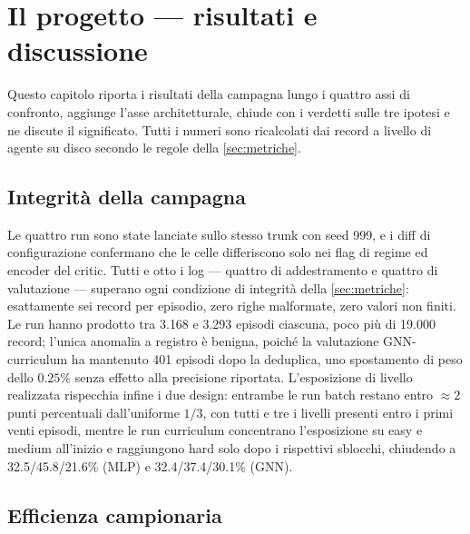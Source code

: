 \chapter{Il progetto --- risultati e discussione}
\label{ch:risultati}

Questo capitolo riporta i risultati della campagna lungo i quattro assi
di confronto, aggiunge l'asse architetturale, chiude con i verdetti
sulle tre ipotesi e ne discute il significato. Tutti i numeri sono
ricalcolati dai record a livello di agente su disco secondo le regole
della \cref{sec:metriche}.

\section{Integrità della campagna}
\label{sec:integrita}

Le quattro run sono state lanciate sullo stesso trunk con seed 999, e i
diff di configurazione confermano che le celle differiscono solo nei
flag di regime ed encoder del critic. Tutti e otto i log --- quattro di
addestramento e quattro di valutazione --- superano ogni condizione di
integrità della \cref{sec:metriche}: esattamente sei record per
episodio, zero righe malformate, zero valori non finiti. Le run hanno
prodotto tra 3{.}168 e 3{.}293 episodi ciascuna, poco più di 19{.}000
record; l'unica anomalia a registro è benigna, poiché la valutazione
GNN-curriculum ha mantenuto 401 episodi dopo la deduplica, uno
spostamento di peso dello $0.25$\% senza effetto alla precisione
riportata. L'esposizione di livello realizzata rispecchia infine i due
design: entrambe le run batch restano entro $\approx 2$ punti
percentuali dall'uniforme $1/3$, con tutti e tre i livelli presenti
entro i primi venti episodi, mentre le run curriculum concentrano
l'esposizione su easy e medium all'inizio e raggiungono hard solo dopo i
rispettivi sblocchi, chiudendo a 32.5/45.8/21.6\% (MLP) e
32.4/37.4/30.1\% (GNN).

\section{Efficienza campionaria}
\label{sec:efficienza}

